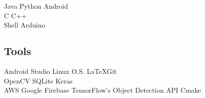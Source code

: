 \documentclass[letterpaper]{deedy-resume} %
\begin{document}
\begin{minipage}[t]{0.33\textwidth}
Java \textbullet{} Python \textbullet{} Android \\ 
C \textbullet{} C++ \\
 Shell  \textbullet{} Arduino

\subsection{Tools}
	Android Studio \textbullet{} Linux O.S. \textbullet{} \LaTeX \textbullet Git \\
	OpenCV \textbullet{} SQLite \textbullet{} Keras \\
	AWS \textbullet{} Google Firebase \textbullet{} TensorFlow's Object Detection API \textbullet{} Cmake

\sectionspace %


\end{minipage} %
\hfill
%
%
\end{document}
